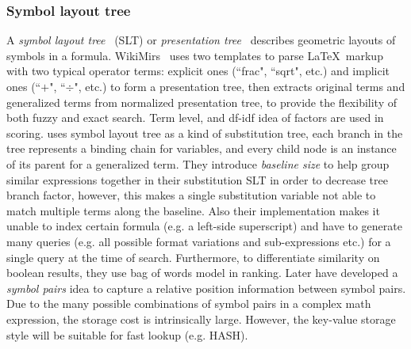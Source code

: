 \subsubsection*{Symbol layout tree}
A \textit{symbol layout tree}~\cite{symbollayout12} (SLT) or \textit{presentation tree}~\cite{WikiMirs13} describes geometric layouts of symbols in a formula. 
WikiMirs~\cite{WikiMirs13} uses two templates to parse \LaTeX\  markup with two typical operator terms: explicit ones (``\bbb frac", ``\bbb sqrt", etc.) and implicit ones (``$+$", ``$\div$", etc.) to form a presentation tree, then extracts original terms and generalized terms from normalized presentation tree, to provide the flexibility of both fuzzy and exact search. Term level, and df-idf idea of factors are used in scoring.
\cite{symbollayout12} uses symbol layout tree as a kind of substitution tree, each branch in the tree represents a binding chain for variables, and every child node is an instance of its parent for a generalized term. 
They introduce \textit{baseline size} to help group similar expressions together in their substitution SLT in order to decrease tree branch factor, however, this makes a single substitution variable not able to match multiple terms along the baseline. 
Also their implementation makes it unable to index certain formula (e.g. a left-side superscript) and have to generate many queries (e.g. all possible format variations and sub-expressions etc.) for a single query at the time of search.
Furthermore, to differentiate similarity on boolean results, they use bag of words model in ranking.
Later \cite{symbolpairs15,symbolpair15:2} have developed a \textit{symbol pairs} idea to capture a relative position information between symbol pairs. Due to the many possible combinations of symbol pairs in a complex math expression, the storage cost is intrinsically large. However, the key-value storage style will be suitable for fast lookup (e.g. HASH). 

